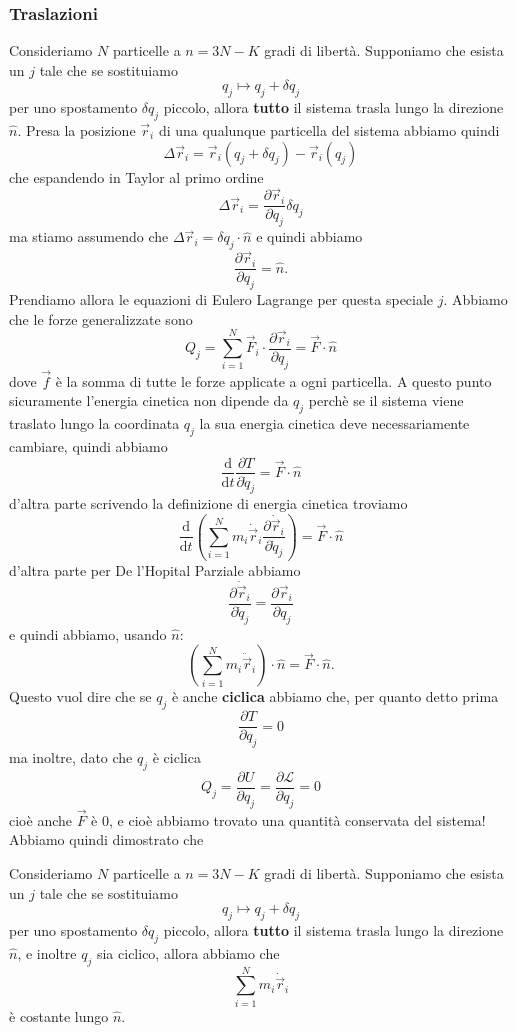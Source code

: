 \documentclass[11pt]{scrartcl}
\newcommand{\dif}{\text{d}}
\newcommand{\posit}{\vec{r}}
\newcommand{\veloc}{\dot{\vec{r}}}
\newcommand{\accel}{\ddot{\vec{r}}}
\begin{document}
	\subsubsection{Traslazioni}
	Consideriamo $N$ particelle a $n=3N-K$ gradi di libertà. Supponiamo che esista un $j$ tale che se sostituiamo 
	$$q_j \mapsto q_j +\delta q_j$$
	per uno spostamento $\delta q_j$ piccolo, allora \textbf{tutto} il sistema trasla lungo la direzione $\hat{n}$. Presa la posizione $\posit_i$ di una qualunque particella del sistema abbiamo quindi
	$$\Delta \posit_i=\posit_i\left(q_j+\delta q_j\right)-\posit_i(q_j)$$
	che espandendo in Taylor al primo ordine
	$$\Delta \posit_i =\frac{\partial \posit_i}{\partial q_j}\delta q_j$$
	ma stiamo assumendo che $\Delta \posit_i=\delta q_j \cdot \hat{n}$ e quindi abbiamo
	$$\frac{\partial \posit_i}{\partial q_j}=\hat{n}.$$
	Prendiamo allora le equazioni di Eulero Lagrange per questa speciale $j$. Abbiamo che le forze generalizzate sono
	$$Q_j=\sum_{i=1}^{N}\vec{F}_i\cdot \frac{\partial \posit_i}{\partial q_j}=\vec{F}\cdot \hat{n}$$
	dove $\vec{f}$ è la somma di tutte le forze applicate a ogni particella. A questo punto sicuramente l'energia cinetica non dipende da $q_j$ perchè se il sistema viene traslato lungo la coordinata $q_j$ la sua energia cinetica deve necessariamente cambiare, quindi abbiamo
	$$\frac{\dif }{\dif t}\frac{\partial T}{\partial \dot{q}_j}=\vec{F}\cdot \hat{n}$$
	d'altra parte scrivendo la definizione di energia cinetica troviamo
	$$\frac{\dif}{\dif t}\left(\sum_{i=1}^{N}m_i \veloc_i\frac{\partial \veloc_i}{\partial \dot{q}_j}\right)=\vec{F}\cdot \hat{n}$$
	d'altra parte per De l'Hopital Parziale abbiamo
	$$\frac{\partial \veloc_i}{\partial \dot{q}_j}=\frac{\partial \posit_i}{\partial q_j}$$
	e quindi abbiamo, usando $\hat{n}$:
	$$\left(\sum_{i=1}^{N}m_i \accel_i\right)\cdot\hat{n}=\vec{F}\cdot\hat{n}.$$
	Questo vuol dire che se $q_j$ è anche \textbf{ciclica} abbiamo che, per quanto detto prima
	$$\frac{\partial T}{\partial q_j}=0$$
	ma inoltre, dato che $q_j$ è ciclica
	$$Q_j=\frac{\partial U}{\partial q_j}=\frac{\partial \mathcal{L}}{\partial q_j}=0$$
	cioè anche $\vec{F}$ è $0$, e cioè abbiamo trovato una quantità conservata del sistema! Abbiamo quindi dimostrato che 
	\begin{theorem}
		Consideriamo $N$ particelle a $n=3N-K$ gradi di libertà. Supponiamo che esista un $j$ tale che se sostituiamo 
		$$q_j \mapsto q_j +\delta q_j$$
		per uno spostamento $\delta q_j$ piccolo, allora \textbf{tutto} il sistema trasla lungo la direzione $\hat{n}$, e inoltre $q_j$ sia ciclico, allora abbiamo che 
		$$\sum_{i=1}^{N}m_i \veloc_i$$
		è costante lungo $\hat{n}$.
	\end{theorem}
\end{document}
